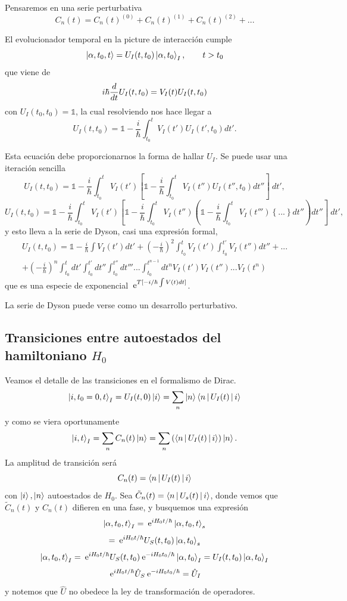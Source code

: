 \documentclass[10pt,oneside]{CBFT_book}
\begin{document}
Pensaremos en una serie perturbativa 
\[
	C_n(t) = C_n(t)^{(0)} + C_n(t)^{(1)}  + C_n(t)^{(2)}  + ...
\]

El evolucionador temporal en la picture de interacción cumple 
\[
	\Ket{\alpha,t_0,t} = U_I(t,t_0)\Ket{\alpha,t_0}_I, \qquad t > t_0
\]
que viene de  
\[
	i\hbar \frac{d^{\hspace{-0.05em}} {}}{d {t}^{\hspace{-0.05em}}} U_I(t,t_0) = V_I(t) U_I(t,t_0)
\]
con $U_I(t_0,t_0)=\mathbb{1}$, la cual resolviendo nos hace llegar a 
\[
	U_I(t,t_0) = \mathbb{1} - \frac{i}{\hbar}\int_{t_0}^{t} V_I(t')U_I(t',t_0) dt'.
\]

Esta ecuación debe proporcionarnos la forma de hallar $U_I$. Se puede usar una iteración sencilla
\[
	U_I(t,t_0) = \mathbb{1} - \frac{i}{\hbar} \int_{t_0}^t \: V_I(t') \left[ 
	\mathbb{1} - \frac{i}{\hbar} \int_{t_0}^t \: V_I(t'') U_I(t'',t_0) dt''
	\right] \: dt',
\]
\[
	U_I(t,t_0) = \mathbb{1} - \frac{i}{\hbar} \int_{t_0}^t \: V_I(t') \left[ 
	\mathbb{1} - \frac{i}{\hbar} \int_{t_0}^t \: V_I(t'') \left(
	\mathbb{1} - \frac{i}{\hbar} \int_{t_0}^t \: V_I(t''') \left\{ ... \right\} dt''
	\right) dt''
	\right] \: dt',
\]
y esto lleva a la serie de Dyson, casi una expresión formal,
\begin{multline*}
	U_I(t,t_0) = \mathbb{1} - \frac{i}{\hbar}\int V_I(t') dt' + \left( -\frac{i}{\hbar} \right)^2\int_{t_0}^t 
	V_I(t') \int_{t_0}^{t'}V_I(t'')dt'' + ...\\ + \left( -\frac{i}{\hbar} \right)^n 
	\int_{t_0}^t dt'\int_{t_0}^{t'}dt''\int_{t_0}^{t''}dt''' ... \int_{t_0}^{t^{n-1}}dt^{n} V_I(t') 
	V_I(t'')...V_I(t^n)	
\end{multline*}
que es una especie de exponencial $ \:\mathrm{e}^{T[-i/\hbar \int V(t) dt ]}$.

La serie de Dyson puede verse como un desarrollo perturbativo.

\subsection{Transiciones entre autoestados del hamiltoniano $H_0$}

Veamos el detalle de las transiciones en el formalismo de Dirac.
\[
	\Ket{i,t_0=0,t}_I = U_I(t,0) \Ket{i} = \sum_n \Ket{n}\Braket{n|U_I(t)|i}
\]
y como se viera oportunamente
\[
	\Ket{i,t}_I = \sum_n C_n(t)\Ket{n} = \sum_n \left( \Braket{n|U_I(t)|i} \right) \Ket{n}.
\]
La amplitud de transición será 
\[
	C_n(t) = \Braket{n|U_I(t)|i}
\]
con $\Ket{i},\Ket{n}$ autoestados de $H_0$.
Sea $\tilde{C}_n(t)=\Braket{n|U_s(t)|i}$, donde vemos que $\tilde{C}_n(t)$ y $C_n(t)$ difieren en
una fase, y busquemos una expresión 
\[
	\Ket{\alpha, t_0, t}_I = \:\mathrm{e}^{iH_0t/\hbar} \Ket{\alpha, t_0, t}_s
\]
\[ 
	= \:\mathrm{e}^{iH_0t/\hbar} U_S(t,t_0)\Ket{\alpha, t_0}_s
\]
\[
	\Ket{\alpha, t_0, t}_I  = \:\mathrm{e}^{iH_0t/\hbar} U_S(t,t_0) \:\mathrm{e}^{-iH_0t_0/\hbar}  \Ket{\alpha, t_0}_I
	= U_I(t,t_0) \Ket{\alpha,t_0}_I
\]
\[
	\:\mathrm{e}^{iH_0t/\hbar} \hat{U}_S \:\mathrm{e}^{-iH_0t_0/\hbar} = \hat{U}_I
\]
y notemos que $\hat{U}$ no obedece la ley de transformación de operadores.
\end{document}
